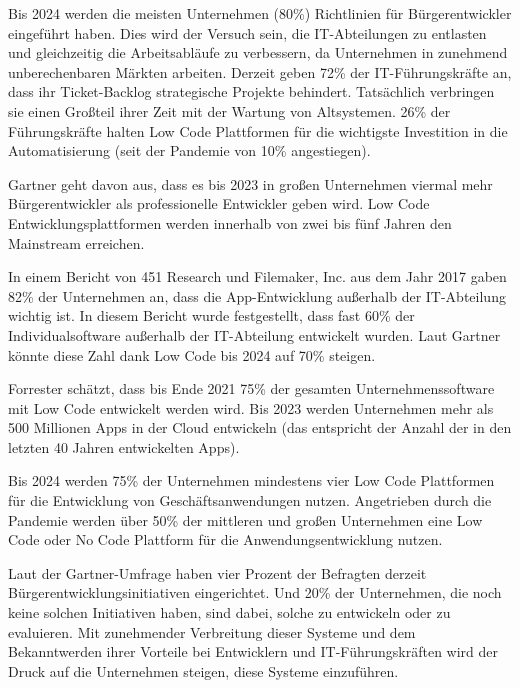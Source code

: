 \documentclass[12pt]{article} %
\begin{document}
	Bis 2024 werden die meisten Unternehmen (80\%) Richtlinien für Bürgerentwickler eingeführt haben. Dies wird der Versuch sein, die IT-Abteilungen zu entlasten und gleichzeitig die Arbeitsabläufe zu verbessern, da Unternehmen in zunehmend unberechenbaren Märkten arbeiten. 	
	Derzeit geben 72\% der IT-Führungskräfte an, dass ihr Ticket-Backlog strategische Projekte behindert. Tatsächlich verbringen sie einen Großteil ihrer Zeit mit der Wartung von Altsystemen. 26\% der Führungskräfte halten Low Code Plattformen für die wichtigste Investition in die Automatisierung (seit der Pandemie von 10\% angestiegen). \autocite{KevinShuler.2023} \newline
	
	Gartner geht davon aus, dass es bis 2023 in großen Unternehmen viermal mehr Bürgerentwickler als professionelle Entwickler geben wird. Low Code Entwicklungsplattformen werden innerhalb von zwei bis fünf Jahren den Mainstream erreichen. \autocite{KevinShuler.2023} \newline
	
	In einem Bericht von 451 Research und Filemaker, Inc. aus dem Jahr 2017 gaben 82\% der Unternehmen an, dass die App-Entwicklung außerhalb der IT-Abteilung wichtig ist. In diesem Bericht wurde festgestellt, dass fast 60\% der Individualsoftware außerhalb der IT-Abteilung entwickelt wurden. Laut Gartner könnte diese Zahl dank Low Code bis 2024 auf 70\% steigen. \autocite{KevinShuler.2023}\newline
	
	Forrester schätzt, dass bis Ende 2021 75\% der gesamten Unternehmenssoftware mit Low Code entwickelt werden wird. Bis 2023 werden Unternehmen mehr als 500 Millionen Apps in der Cloud entwickeln (das entspricht der Anzahl der in den letzten 40 Jahren entwickelten Apps). \autocite{KevinShuler.2023} \newline
	
	Bis 2024 werden 75\% der Unternehmen mindestens vier Low Code Plattformen für die Entwicklung von Geschäftsanwendungen nutzen. Angetrieben durch die Pandemie werden über 50\% der mittleren und großen Unternehmen eine Low Code oder No Code Plattform für die Anwendungsentwicklung nutzen. \autocite{KevinShuler.2023} \newline
	
	Laut der Gartner-Umfrage haben vier Prozent der Befragten derzeit Bürgerentwicklungsinitiativen eingerichtet. Und 20\% der Unternehmen, die noch keine solchen Initiativen haben, sind dabei, solche zu entwickeln oder zu evaluieren. Mit zunehmender Verbreitung dieser Systeme und dem Bekanntwerden ihrer Vorteile bei Entwicklern und IT-Führungskräften wird der Druck auf die Unternehmen steigen, diese Systeme einzuführen. \autocite{KevinShuler.2023} \newline
	
\end{document}
